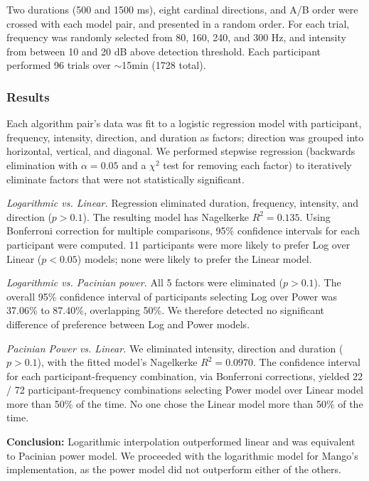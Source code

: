 Two durations (500 and 1500 ms), eight cardinal directions, and A/B order were crossed with each model pair, and presented in a random order.
For each trial, frequency was randomly selected from 80, 160, 240, and 300 Hz, and intensity from between 10 and 20 dB above detection threshold.
Each participant performed 96 trials over $\sim$15min (1728 total). 

\subsubsection{Results}
Each algorithm pair's data was fit  to a logistic regression model with participant, frequency, intensity, direction, and duration as factors;  direction was grouped into horizontal, vertical, and diagonal.
We performed stepwise regression (backwards elimination with $\alpha=0.05$ and a $\chi^2$ test for removing each factor) to iteratively eliminate factors that were not statistically significant. %

\emph{Logarithmic vs. Linear.}
Regression eliminated %
duration, frequency, intensity, and direction ($p>0.1$).
The resulting model has Nagelkerke $R^2=0.135$.
Using Bonferroni correction for multiple comparisons, 95\% confidence intervals for each participant were computed. 
11 participants were more likely to prefer Log over Linear ($p<0.05$) models; none were likely to prefer the Linear model.

\emph{Logarithmic vs. Pacinian power.}
All 5 factors were eliminated ($p>0.1$).
The overall 95\% confidence interval of participants selecting Log over Power was 37.06\% to 87.40\%, overlapping 50\%.
We therefore detected no significant difference of preference between Log and Power models.

\emph{Pacinian Power vs. Linear.}
We eliminated %
intensity, direction and duration ($p>0.1$), with the fitted model's %
Nagelkerke $R^2=0.0970$.
The confidence interval for each participant-frequency combination, via Bonferroni corrections, yielded 22 / 72 participant-frequency combinations selecting Power model over Linear model more than 50\% of the time.
No one chose the Linear model more than 50\% of the time.

\textbf{Conclusion:}
Logarithmic interpolation outperformed linear and was %
equivalent to Pacinian power model. We proceeded with the logarithmic model for Mango's implementation, as the power model did not outperform either of the others. %

